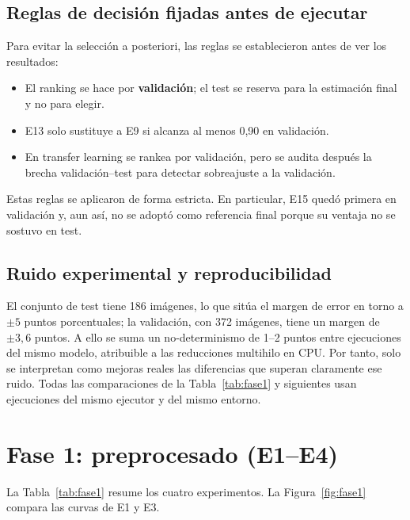 \documentclass[11pt,a4paper]{article}
\begin{document}
\subsection{Reglas de decisión fijadas antes de ejecutar}

Para evitar la selección a posteriori, las reglas se establecieron antes de ver los resultados:

\begin{itemize}
  \item El ranking se hace por \textbf{validación}; el test se reserva para la estimación final y no para elegir.
  \item E13 solo sustituye a E9 si alcanza al menos 0,90 en validación.
  \item En transfer learning se rankea por validación, pero se audita después la brecha validación--test para detectar sobreajuste a la validación.
\end{itemize}

Estas reglas se aplicaron de forma estricta. En particular, E15 quedó primera en validación y, aun así, no se adoptó como referencia final porque su ventaja no se sostuvo en test.

\subsection{Ruido experimental y reproducibilidad}

El conjunto de test tiene 186 imágenes, lo que sitúa el margen de error en torno a $\pm5$ puntos porcentuales; la validación, con 372 imágenes, tiene un margen de $\pm3,6$ puntos. A ello se suma un no-determinismo de 1--2 puntos entre ejecuciones del mismo modelo, atribuible a las reducciones multihilo en CPU. Por tanto, solo se interpretan como mejoras reales las diferencias que superan claramente ese ruido. Todas las comparaciones de la Tabla~\ref{tab:fase1} y siguientes usan ejecuciones del mismo ejecutor y del mismo entorno.

\section{Fase 1: preprocesado (E1--E4)}

La Tabla~\ref{tab:fase1} resume los cuatro experimentos. La Figura~\ref{fig:fase1} compara las curvas de E1 y E3.
\end{document}
